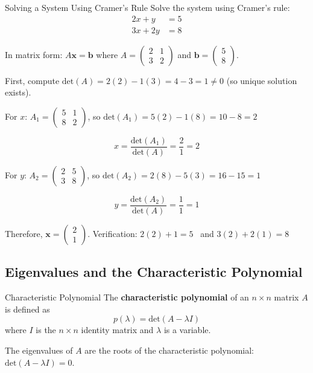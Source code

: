 \documentclass[12pt,a4paper]{article}
\newcommand{\vv}[1]{\mathbf{#1}}
\newcommand{\Det}{\text{det}}
\begin{document}
	\begin{example}{Solving a System Using Cramer's Rule}
		Solve the system using Cramer's rule:
		\begin{align*}
			2x + y &= 5 \\
			3x + 2y &= 8
		\end{align*}
		
		In matrix form: $A\vv{x} = \vv{b}$ where $A = \begin{pmatrix} 2 & 1 \\ 3 & 2 \end{pmatrix}$ and $\vv{b} = \begin{pmatrix} 5 \\ 8 \end{pmatrix}$.
		
		First, compute $\Det(A) = 2(2) - 1(3) = 4 - 3 = 1 \neq 0$ (so unique solution exists).
		
		For $x$: $A_1 = \begin{pmatrix} 5 & 1 \\ 8 & 2 \end{pmatrix}$, so $\Det(A_1) = 5(2) - 1(8) = 10 - 8 = 2$
		
		\[
		x = \frac{\Det(A_1)}{\Det(A)} = \frac{2}{1} = 2
		\]
		
		For $y$: $A_2 = \begin{pmatrix} 2 & 5 \\ 3 & 8 \end{pmatrix}$, so $\Det(A_2) = 2(8) - 5(3) = 16 - 15 = 1$
		
		\[
		y = \frac{\Det(A_2)}{\Det(A)} = \frac{1}{1} = 1
		\]
		
		Therefore, $\vv{x} = \begin{pmatrix} 2 \\ 1 \end{pmatrix}$. Verification: $2(2) + 1 = 5$ \checkmark\ and $3(2) + 2(1) = 8$ \checkmark
	\end{example}
	
	\subsection{Eigenvalues and the Characteristic Polynomial}
	
	\begin{definition}{Characteristic Polynomial}
		The \textbf{characteristic polynomial} of an $n \times n$ matrix $A$ is defined as
		\[
		p(\lambda) = \Det(A - \lambda I)
		\]
		where $I$ is the $n \times n$ identity matrix and $\lambda$ is a variable.
		
		The eigenvalues of $A$ are the roots of the characteristic polynomial: $\Det(A - \lambda I) = 0$.
	\end{definition}
	
\end{document}
